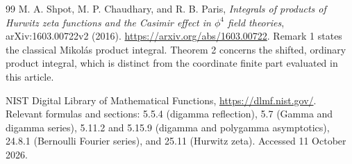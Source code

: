 \begin{thebibliography}{99}
M. A. Shpot, M. P. Chaudhary, and R. B. Paris,
\emph{Integrals of products of Hurwitz zeta functions and the Casimir
effect in $\phi^4$ field theories},
arXiv:1603.00722v2 (2016).
\url{https://arxiv.org/abs/1603.00722}.
Remark 1 states the classical Mikol\'as product integral.  Theorem 2
concerns the shifted, ordinary product integral, which is distinct
from the coordinate finite part evaluated in this article.

NIST Digital Library of Mathematical Functions,
\url{https://dlmf.nist.gov/}.
Relevant formulas and sections: 5.5.4 (digamma reflection),
5.7 (Gamma and digamma series), 5.11.2 and 5.15.9
(digamma and polygamma asymptotics), 24.8.1
(Bernoulli Fourier series), and 25.11 (Hurwitz zeta).
Accessed 11 October 2026.

\end{thebibliography}
